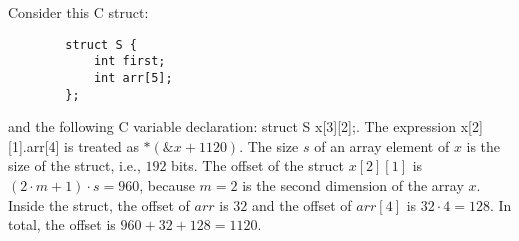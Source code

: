 \begin{example}
    Consider this C struct:
    \begin{verbatim}
        struct S {
            int first;
            int arr[5];
        };
                \end{verbatim}

    and the following C variable declaration: \textsf{struct S x[3][2];}.
    The expression \textsf{x[2][1].arr[4]} is treated as $*(\&x + 1120)$.
    The size $s$ of an array element of $x$ is the size of the struct, i.e., $192$ bits.
    The offset of the struct $x[2][1]$ is $(2 \cdot m + 1) \cdot s = 960$, because $m = 2$ is the second dimension of the array $x$.
    Inside the struct, the offset of $arr$ is $32$ and the offset of $arr[4]$ is $32\cdot 4 = 128$.
    In total, the offset is $960 + 32 + 128 = 1120$.
\end{example}

